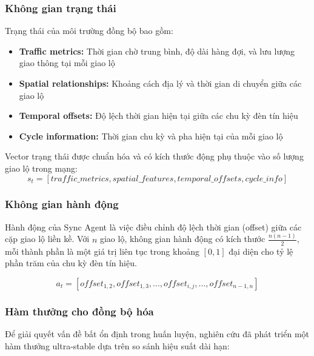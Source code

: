 \subsubsection{Không gian trạng thái}
Trạng thái của môi trường đồng bộ bao gồm:
\begin{itemize}
    \item \textbf{Traffic metrics:} Thời gian chờ trung bình, độ dài hàng đợi,
        và lưu lượng giao thông tại mỗi giao lộ

    \item \textbf{Spatial relationships:} Khoảng cách địa lý và thời gian di
        chuyển giữa các giao lộ

    \item \textbf{Temporal offsets:} Độ lệch thời gian hiện tại giữa các chu kỳ
        đèn tín hiệu

    \item \textbf{Cycle information:} Thời gian chu kỳ và pha hiện tại của mỗi
        giao lộ
\end{itemize}

Vector trạng thái được chuẩn hóa và có kích thước động phụ thuộc vào số lượng giao lộ trong mạng:
\[
    s_{t} = [traffic\_metrics, spatial\_features, temporal\_offsets, cycle\_info]
\]

\subsubsection{Không gian hành động}
Hành động của Sync Agent là việc điều chỉnh độ lệch thời gian (offset) giữa các cặp giao lộ liền kề. Với $n$ giao lộ, không gian hành động có kích thước $\frac{n(n-1)}{2}$, mỗi thành phần là một giá trị liên tục trong khoảng $[0, 1]$ đại diện cho tỷ lệ phần trăm của chu kỳ đèn tín hiệu.

\[
    a_{t} = [offset_{1,2}, offset_{1,3}, ..., offset_{i,j}, ..., offset_{n-1,n}]
\]

\subsubsection{Hàm thưởng cho đồng bộ hóa}
Để giải quyết vấn đề bất ổn định trong huấn luyện, nghiên cứu đã phát triển một hàm thưởng ultra-stable dựa trên so sánh hiệu suất dài hạn:

